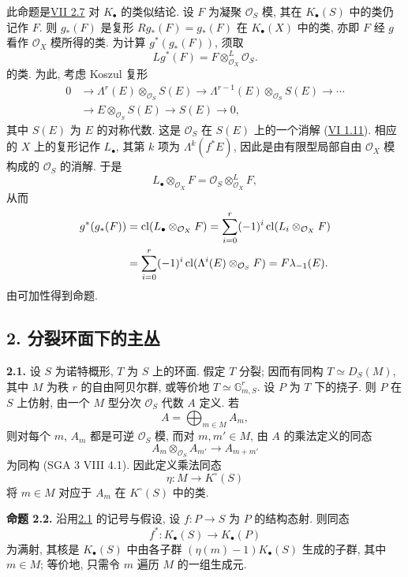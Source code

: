 此命题是\hyperlink{sga6.e07.para.2-6}{VII 2.7} 对 $K_\bullet$ 的类似结论. 设 $F$ 为凝聚 $\mathcal O_S$ 模, 其在 $K_\bullet(S)$ 中的类仍记作 $F$. 则 $g_*(F)$ 是复形 $Rg_*(F)=g_*(F)$ 在 $K_\bullet(X)$ 中的类, 亦即 $F$ 经 $g$ 看作 $\mathcal O_X$ 模所得的类. 为计算 $g^*(g_*(F))$, 须取
\[
 Lg^*(F)=F\otimes^L_{\mathcal O_X}\mathcal O_S.
\]
的类. 为此, 考虑 Koszul 复形
\[
\begin{aligned}
0&\longrightarrow \Lambda^r(E)\otimes_{\mathcal O_S}S(E)\longrightarrow
\Lambda^{r-1}(E)\otimes_{\mathcal O_S}S(E)\longrightarrow \cdots\\
&\longrightarrow E\otimes_{\mathcal O_S}S(E)\longrightarrow S(E)\longrightarrow 0,
\end{aligned}
\]
其中 $S(E)$ 为 $E$ 的对称代数. 这是 $\mathcal O_S$ 在 $S(E)$ 上的一个消解 (\hyperlink{sga6.e06.sec.1.10}{VI 1.11}). 相应的 $X$ 上的复形记作 $L_\bullet$, 其第 $k$ 项为 $\Lambda^k(f^*E)$, 因此是由有限型局部自由 $\mathcal O_X$ 模构成的 $\mathcal O_S$ 的消解. 于是
\[
 L_\bullet\otimes_{\mathcal O_X}F=\mathcal O_S\otimes^L_{\mathcal O_X}F,
\]
从而
\[
\begin{aligned}
 g^*(g_*(F))
 &=\operatorname{cl}(L_\bullet\otimes_{\mathcal O_X}F)
   =\sum_{i=0}^r(-1)^i\operatorname{cl}(L_i\otimes_{\mathcal O_X}F)\\
 &=\sum_{i=0}^r(-1)^i\operatorname{cl}(\Lambda^i(E)\otimes_{\mathcal O_S}F)
   =F\lambda_{-1}(E).
\end{aligned}
\]
由可加性得到命题.

\subsection*{2. 分裂环面下的主丛}

\textbf{2.1.} 设 $S$ 为诺特概形, $T$ 为 $S$ 上的环面. 假定 $T$ 分裂; 因而有同构 $T\simeq D_S(M)$, 其中 $M$ 为秩 $r$ 的自由阿贝尔群, 或等价地 $T\simeq \mathbb G_{m,S}^r$. 设 $P$ 为 $T$ 下的挠子. 则 $P$ 在 $S$ 上仿射, 由一个 $M$ 型分次 $\mathcal O_S$ 代数 $A$ 定义. 若
\[
 A=\bigoplus_{m\in M}A_m,
\]
则对每个 $m$, $A_m$ 都是可逆 $\mathcal O_S$ 模, 而对 $m,m'\in M$, 由 $A$ 的乘法定义的同态
\[
 A_m\otimes_{\mathcal O_S}A_{m'}\longrightarrow A_{m+m'}
\]
为同构 (SGA 3 VIII 4.1). 因此定义乘法同态
\[
 \eta:M\longrightarrow K^\circ(S)
\]
将 $m\in M$ 对应于 $A_m$ 在 $K^\circ(S)$ 中的类.

\textbf{命题 2.2.} 沿用\hyperlink{sga6.e09.para.2-1}{2.1} 的记号与假设, 设 $f:P\to S$ 为 $P$ 的结构态射. 则同态
\[
 f^*:K_\bullet(S)\longrightarrow K_\bullet(P)
\]
为满射, 其核是 $K_\bullet(S)$ 中由各子群 $(\eta(m)-1)K_\bullet(S)$ 生成的子群, 其中 $m\in M$; 等价地, 只需令 $m$ 遍历 $M$ 的一组生成元.

